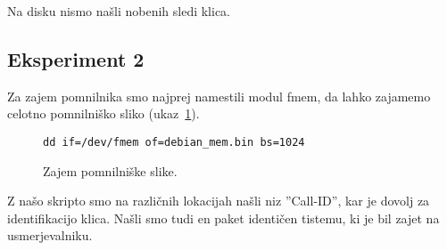 \documentclass{acm_proc_article-sp}
\begin{document}
Na disku nismo našli nobenih sledi klica.

\subsection{Eksperiment 2}

Za zajem pomnilnika smo najprej namestili modul fmem, da lahko zajamemo celotno pomnilniško sliko (ukaz~\ref{fig:fmem}).

\begin{figure}
\centering
\begin{verbatim}
dd if=/dev/fmem of=debian_mem.bin bs=1024
\end{verbatim}
\caption{Zajem pomnilniške slike.}
\label{fig:fmem}
\end{figure}

Z našo skripto smo na različnih lokacijah našli niz ''Call-ID'', kar je dovolj za identifikacijo klica. Našli smo tudi en paket identičen tistemu, ki je bil zajet na usmerjevalniku.
\end{document}
